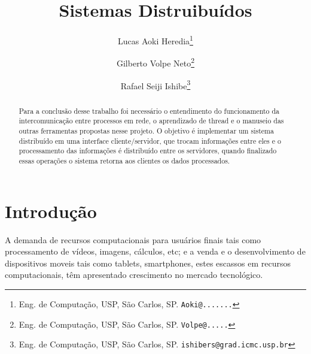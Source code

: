 \documentclass[11pt,twoside]{article}
\begin{document}
%

\title{Sistemas Distruibuídos}

\author{Lucas Aoki Heredia\thanks{Eng. de Computação, USP, São Carlos, SP. \texttt{Aoki@.......}} \and
Gilberto Volpe Neto\thanks{Eng. de Computação, USP, São Carlos, SP.  \texttt{Volpe@.....}} \and
Rafael Seiji Ishibe\thanks{Eng. de Computação, USP, São Carlos, SP.  \texttt{ishibers@grad.icmc.usp.br}}}

\date{}

\maketitle


\newpage
\begin{abstract} 
Para a conclusão desse trabalho foi necessário o entendimento do funcionamento da intercomunicação entre processos em rede, o aprendizado de thread e o manuseio das outras ferramentas propostas nesse projeto.
O objetivo é implementar um sistema distribuído em uma interface cliente/servidor, que trocam informações entre eles e o processamento das informações é distribuído entre os servidores, quando finalizado essas operações o sistema retorna aos clientes os dados processados.
\end{abstract}


\newpage
\section{Introdução}

  A demanda de recursos computacionais para usuários finais tais como processamento de vídeos, imagens, cálculos, etc; e a venda e o desenvolvimento de dispositivos moveis tais como tablets, smartphones, estes escassos em recursos computacionais, têm apresentado crescimento no mercado tecnológico.
\end{document}
